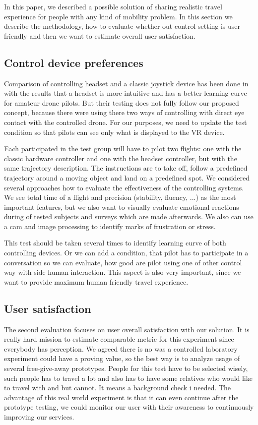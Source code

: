 In this paper, we described a possible solution of sharing realistic travel experience for people with any kind of mobility problem. In this section we describe the methodology, how to evaluate whether out control setting is user friendly and then we want to estimate overall user satisfaction.

\vspace{40pt}
\subsection{Control device preferences}
Comparison of controlling headset and a classic joystick device has been done in \cite{mangina2016drones} with the results that a headset is more intuitive and has a better learning curve for amateur drone pilots. But their testing does not fully follow our proposed concept, because there were using there two ways of controlling with direct eye contact with the controlled drone. For our purposes, we need to update the test condition so that pilots can see only what is displayed to the VR device.

Each participated in the test group will have to pilot two flights: one with the classic hardware controller and one with the headset controller, but with the same trajectory description. The instructions are to take off, follow a predefined trajectory around a moving object and land on a predefined spot. We considered several approaches how to evaluate the effectiveness of the controlling systems. We see total time of a flight and precision (stability, fluency, ...) as the most important features, but we also want to visually evaluate emotional reactions during of tested subjects and surveys which are made afterwards. We also can use a cam and image processing to identify marks of frustration or stress.

This test should be taken several times to identify learning curve of both controlling devices. Or we can add a condition, that pilot has to participate in a conversation so we can evaluate, how good are pilot using one of other control way with side human interaction. This aspect is also very important, since we want to provide maximum human friendly travel experience.

\subsection{User satisfaction}
The second evaluation focuses on user overall satisfaction with our solution. It is really hard mission to estimate comparable metric for this experiment since everybody has perception. We agreed there is no was a controlled laboratory experiment could have a proving value, so the best way is to analyze usage of several free-give-away prototypes. People for this test have to be selected wisely, such people has to travel a lot and also has to have some relatives who would like to travel with and but cannot. It means a background check i needed. The advantage of this real world experiment is that it can even continue after the prototype testing, we could monitor our user with their awareness to continuously improving our services.

